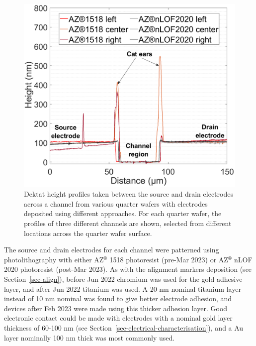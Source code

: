 \documentclass[
  a4paper,
]{scrbook}
\begin{document}
\begin{figure}
\begin{minipage}[t]{0.47\linewidth}
{{\includegraphics{./figures/ch4/dektat_1518nlof_profile_comparison.png}

}

}

\end{minipage}%

\caption{\label{fig-electrodes-dektat}Dektat height profiles taken
between the source and drain electrodes across a channel from various
quarter wafers with electrodes deposited using different approaches. For
each quarter wafer, the profiles of three different channels are shown,
selected from different locations across the quarter wafer surface.}

\end{figure}

The source and drain electrodes for each channel were patterned using
photolithography with either AZ\(^\circledR\) 1518 photoresist (pre-Mar
2023) or AZ\(^\circledR\) nLOF 2020 photoresist (post-Mar 2023). As with
the alignment markers deposition (see Section~\ref{sec-align}), before
Jun 2022 chromium was used for the gold adhesive layer, and after Jun
2022 titanium was used. A 20 nm nominal titanium layer instead of 10 nm
nominal was found to give better electrode adhesion, and devices after
Feb 2023 were made using this thicker adhesion layer. Good electronic
contact could be made with electrodes with a nominal gold layer
thickness of 60-100 nm (see
Section~\ref{sec-electrical-characterisation}), and a Au layer nominally
100 nm thick was most commonly used.
\end{document}

